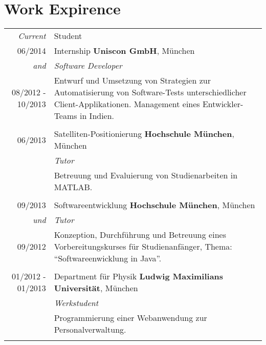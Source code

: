\documentclass[a4paper,10pt]{article} %
\begin{document}
\section{Work Expirence}
 
\begin{tabular}{r|p{11cm}}
 
\emph{Current}             & Student \\
\textsc{06/2014}           & Internship \textbf{Uniscon GmbH}, München\\
\emph{and}		   & \emph{Software Developer}\\
\textsc{08/2012 - 10/2013} & \small{Entwurf und Umsetzung von Strategien zur Automatisierung von Software-Tests unterschiedlicher Client-Applikationen. Management eines Entwickler-Teams in Indien.} \\
\multicolumn{2}{c}{} \\
 
 
\textsc{06/2013}           & Satelliten-Positionierung \textbf{Hochschule München}, München\\
                           & \emph{Tutor}\\
                           & \small{Betreuung und Evaluierung von Studienarbeiten in MATLAB.}\\
\multicolumn{2}{c}{} \\
 
 
\textsc{09/2013}           & Softwareentwicklung \textbf{Hochschule München}, München\\
\emph{und}                 & \emph{Tutor}\\
\textsc{09/2012}           & \small{Konzeption, Durchführung und Betreuung eines Vorbereitungskurses für Studienanfänger, Thema: ``Softwareenwicklung in Java''.}\\
\multicolumn{2}{c}{} \\
 
 
\textsc{01/2012 - 01/2013} & Department für Physik \textbf{Ludwig Maximilians Universität}, München\\
                           & \emph{Werkstudent}\\
                           & \small{Programmierung einer Webanwendung zur Personalverwaltung.}\\
\multicolumn{2}{c}{} \\
 

\end{tabular}
\end{document}
